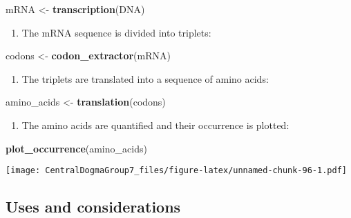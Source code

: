 \documentclass[
]{article}
\newenvironment{Shaded}{\begin{snugshade}}{\end{snugshade}}
\newcommand{\FunctionTok}[1]{\textcolor[rgb]{0.13,0.29,0.53}{\textbf{#1}}}
\newcommand{\NormalTok}[1]{#1}
\newcommand{\OtherTok}[1]{\textcolor[rgb]{0.56,0.35,0.01}{#1}}
\providecommand{\tightlist}{%
  \setlength{\itemsep}{0pt}\setlength{\parskip}{0pt}}
\begin{document}
\begin{Shaded}
\begin{Highlighting}[]
\NormalTok{mRNA }\OtherTok{\textless{}{-}} \FunctionTok{transcription}\NormalTok{(DNA)}
\end{Highlighting}
\end{Shaded}

\begin{enumerate}
\def\labelenumi{\arabic{enumi}.}
\setcounter{enumi}{2}
\tightlist
\item
  The mRNA sequence is divided into triplets:
\end{enumerate}

\begin{Shaded}
\begin{Highlighting}[]
\NormalTok{codons }\OtherTok{\textless{}{-}} \FunctionTok{codon\_extractor}\NormalTok{(mRNA)}
\end{Highlighting}
\end{Shaded}

\begin{enumerate}
\def\labelenumi{\arabic{enumi}.}
\setcounter{enumi}{3}
\tightlist
\item
  The triplets are translated into a sequence of amino acids:
\end{enumerate}

\begin{Shaded}
\begin{Highlighting}[]
\NormalTok{amino\_acids }\OtherTok{\textless{}{-}} \FunctionTok{translation}\NormalTok{(codons)}
\end{Highlighting}
\end{Shaded}

\begin{enumerate}
\def\labelenumi{\arabic{enumi}.}
\setcounter{enumi}{4}
\tightlist
\item
  The amino acids are quantified and their occurrence is plotted:
\end{enumerate}

\begin{Shaded}
\begin{Highlighting}[]
\FunctionTok{plot\_occurrence}\NormalTok{(amino\_acids)}
\end{Highlighting}
\end{Shaded}

\texttt{[image: CentralDogmaGroup7\_files/figure-latex/unnamed-chunk-96-1.pdf]}

\subsection{Uses and considerations}\label{uses-and-considerations}
\end{document}
